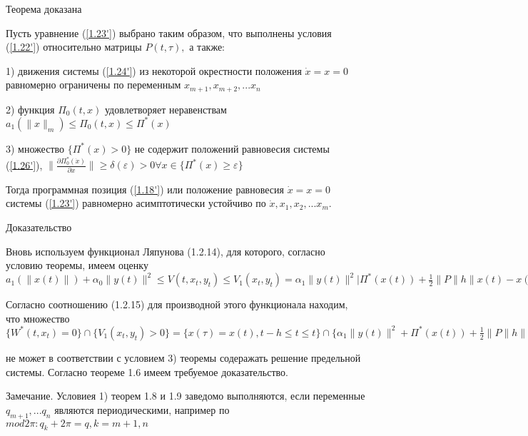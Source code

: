 Теорема доказана

\begin{theorem}\label{t-1.11}
Пусть уравнение (\ref{1.23'}) выбрано таким образом, что выполнены условия (\ref{1.22'}) относительно матрицы $P(t, \tau),$ а также: 

1) движения системы (\ref{1.24'}) из некоторой окрестности положения $\dot x = x = 0$ равномерно ограничены по переменным $x_{m+1}, x_{m+2},... x_n$

2) функция $\Pi_0 (t, x)$ удовлетворяет неравенствам $a_1 (\| x \| _m) \le \Pi_0 (t, x) \le \Pi^{*} (x)$

3) множество $\lbrace \Pi^{*} (x) > 0 \rbrace$ не содержит положений равновесия системы (\ref{1.26'}), $\| \frac{\partial \Pi_0^{*} (\dot x)}{\partial x} \| \ge \delta(\varepsilon) > 0 \forall x \in \lbrace \Pi^{*} (x) \ge \varepsilon \rbrace$

Тогда программная позиция (\ref{1.18'}) или положение равновесия $\dot x = x = 0$ системы (\ref{1.23'}) равномерно асимптотически устойчиво по $\dot x, x_1, x_2, ... x_m.$
\end{theorem}

Доказательство

Вновь используем функционал Ляпунова (1.2.14), для которого, согласно условию теоремы, имеем оценку $a_1 (\| x(t) \|) + \alpha_0 \| y(t) \|^2 \le V(t, x_t, y_t) \le V_1 (x_t, y_t) = \alpha_1 \|y(t)\|^2 | \Pi^{*} (x(t)) + \frac12 \| P \| h \| x(t) - x(\tau) \|^2$

Согласно соотношению (1.2.15) для производной этого функционала находим, что множество $\lbrace W^{*} (t, x_t) = 0 \rbrace \cap \lbrace V_1(x_t, y_t) > 0 \rbrace = \lbrace x(\tau) = x(t), t-h \le t \le t \rbrace \cap \lbrace \alpha_1 \| y(t) \|^2 + \Pi^{*} (x(t)) + \frac12 \| P\| h \| x(t) - x(\tau) \|^2 > 0 \rbrace \equiv \lbrace \Pi^{*} (x(t)) > 0 \rbrace$

не может в соответствии с условием 3) теоремы содеражать решение предельной системы. Согласно теореме 1.6 имеем требуемое доказательство.

Замечание. Условиея 1) теорем 1.8 и 1.9 заведомо выполняются, если переменные $q_{m+1}, ... q_n$ являются периодическими, например по $mod 2 \pi: q_k + 2 \pi = q, k = m + 1, n$